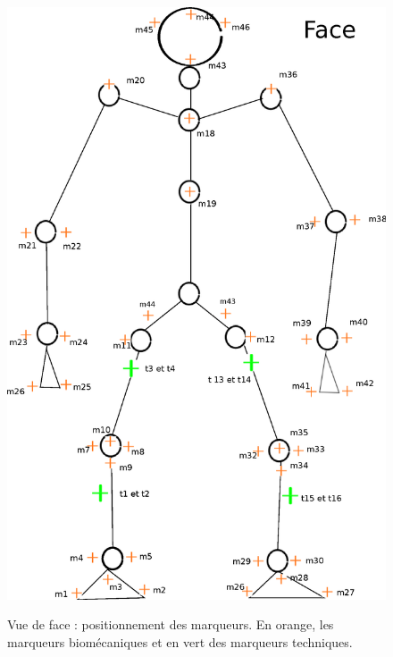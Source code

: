 \documentclass[a4paper, 10pt ]{article}
\begin{document}
\begin{figure}
\includegraphics[width=0.7\columnwidth]{images/modeleHomme.eps}
\label{fig:marqueursFace}
\caption{Vue de face : positionnement des marqueurs. En orange, les marqueurs biomécaniques et en vert des marqueurs techniques.}
\end{figure}
\end{document}
